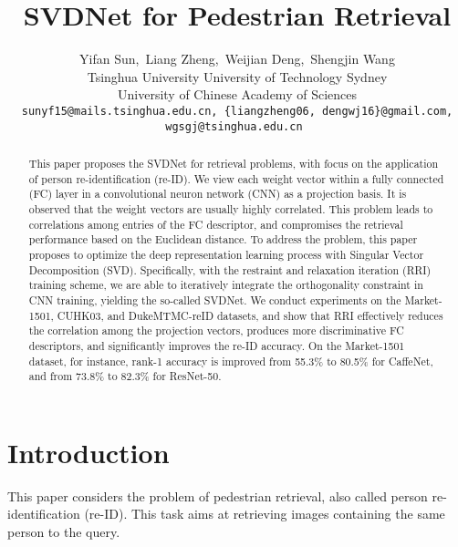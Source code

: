 \documentclass[10pt,twocolumn,letterpaper]{article}
\begin{document}
\title{ SVDNet for Pedestrian Retrieval}

\author{Yifan Sun,\ Liang Zheng,\ Weijian Deng,\ Shengjin Wang \\
 Tsinghua University \quad University of Technology Sydney \\University of Chinese Academy of Sciences\\
{\tt\small sunyf15@mails.tsinghua.edu.cn, \{liangzheng06, dengwj16\}@gmail.com, wgsgj@tsinghua.edu.cn }
 }



\maketitle
\thispagestyle{empty}
\begin{abstract}
    This paper proposes the SVDNet for retrieval problems, with focus on the application of person re-identification (re-ID). We view each weight vector within a fully connected (FC) layer in a convolutional neuron network (CNN) as a projection basis. It is observed that the weight vectors are usually highly correlated. This problem leads to correlations among entries of the FC descriptor, and compromises the retrieval performance based on the Euclidean distance. To address the problem, this paper proposes to optimize the deep representation learning process with Singular Vector Decomposition (SVD). Specifically, with the restraint and relaxation iteration (RRI) training scheme, we are able to iteratively integrate the orthogonality constraint in CNN training, yielding the so-called SVDNet. We conduct experiments on the Market-1501, CUHK03, and DukeMTMC-reID datasets, and show that RRI effectively reduces the correlation among the projection vectors, produces more discriminative FC descriptors, and significantly improves the re-ID accuracy. On the Market-1501 dataset, for instance, rank-1 accuracy is improved from 55.3\% to 80.5\% for CaffeNet, and from 73.8\% to 82.3\% for ResNet-50.
\end{abstract}

\section{Introduction}
This paper considers the problem of pedestrian retrieval, also called person re-identification (re-ID). This task aims at retrieving images containing the same person to the query. 
\end{document}
